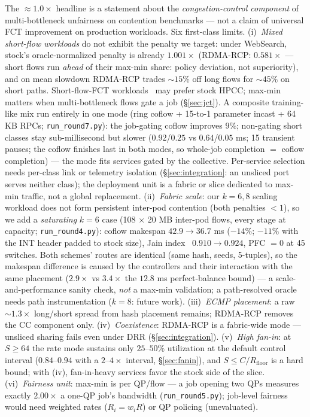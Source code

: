\documentclass[conference]{IEEEtran}
\newcommand{\hpccfs}{\textsc{RDMA-RCP}\xspace}
\begin{document}
The ${\approx}1.0\times$ headline is a statement about the \emph{congestion-control component}
of multi-bottleneck unfairness on contention benchmarks --- not a claim of universal FCT
improvement on production workloads. Six first-class limits. (i)~\emph{Mixed short-flow
workloads} do not exhibit the penalty we target: under WebSearch, stock's oracle-normalized
penalty is already $1.001\times$ (\hpccfs: $0.581\times$ --- short flows run \emph{ahead} of their
max-min share: policy deviation, not superiority), and on mean slowdown \hpccfs trades ${\sim}15\%$ off long flows for ${\sim}45\%$ on
short paths. Short-flow-FCT workloads~\cite{montazeri2018homa,alizadeh2013pfabric} may
prefer stock HPCC; max-min matters when multi-bottleneck flows gate a job (\S\ref{sec:jct}).
A composite training-like mix run entirely in one mode (ring coflow + 15-to-1 parameter
incast + 64 KB RPCs; \texttt{run\_round7.py}): the job-gating coflow improves $9\%$;
non-gating short classes stay sub-millisecond but slower ($0.92$/$0.25$ vs $0.64$/$0.05$ ms;
15 transient pauses; the coflow finishes last in both modes, so whole-job completion $=$
coflow completion) --- the mode fits services gated by the collective.
Per-service selection needs per-class link or telemetry isolation (\S\ref{sec:integration}:
an unsliced port serves neither class); the deployment unit is a fabric or slice dedicated to
max-min traffic, not a global replacement.
(ii)~\emph{Fabric scale}: our $k = 6, 8$ scaling workload does not form persistent
inter-pod contention (both penalties ${<}1$), so we add a \emph{saturating} $k{=}6$ case (108
$\times$ 20 MB inter-pod flows, every stage at capacity; \texttt{run\_round4.py}): coflow
makespan $42.9 \to 36.7$ ms ($-14\%$; $-11\%$ with
the INT header padded to stock size), Jain index~\cite{jain1984fairness} $0.910 \to 0.924$,
PFC $= 0$ at 45 switches. Both
schemes' routes are identical (same hash, seeds, 5-tuples), so the makespan difference is
caused by the controllers and their interaction with the same placement ($2.9\times$ vs
$3.4\times$ the $12.8$ ms perfect-balance bound) --- a scale-and-performance sanity check,
\emph{not} a max-min validation; a path-resolved oracle needs path instrumentation ($k{=}8$: future work). (iii)~\emph{ECMP placement}: a raw ${\sim}1.3\times$ long/short spread from hash placement
remains; \hpccfs removes the CC component only. (iv)~\emph{Coexistence}: \hpccfs is a fabric-wide mode --- unsliced sharing fails even
under DRR (\S\ref{sec:integration}). (v)~\emph{High fan-in}: at $S \ge 64$ the rate mode sustains only $25$--$50\%$
utilization at the default control interval ($0.84$--$0.94$ with a $2$--$4\times$ interval,
\S\ref{sec:fanin}), and $S \le C/R_{\mathrm{floor}}$ is a hard bound; with (iv), fan-in-heavy
services favor the stock side of the slice.
(vi)~\emph{Fairness unit}: max-min is per QP/flow --- a job opening two QPs measures
exactly $2.00\times$ a one-QP job's bandwidth (\texttt{run\_round5.py}); job-level
fairness would need weighted rates ($R_i = w_i R$) or QP policing (unevaluated).
\end{document}
